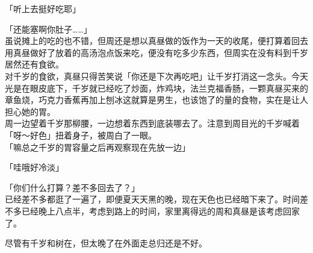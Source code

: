 「听上去挺好吃耶」

「还能塞啊你肚子……」\\

虽说摊上的吃的也不错，但周还是想以真昼做的饭作为一天的收尾，便打算着回去用真昼做好了放着的高汤泡点饭来吃，便没有吃多少东西，但周实在没有料到千岁居然还有食欲。\\

对千岁的食欲，真昼只得苦笑说「你还是下次再吃吧」让千岁打消这一念头。今天光是在眼皮底下，千岁就已经吃了炒面，炸鸡块，法兰克福香肠，一颗真昼买来的章鱼烧，巧克力香蕉再加上刨冰这就算是男生，也该饱了的量的食物，实在是让人担心她的胃。\\

周一边望着千岁那柳腰，一边想着东西到底装哪去了。注意到周目光的千岁喊着「呀～好色」扭着身子，被周白了一眼。\\

「嘛总之千岁的胃容量之后再观察现在先放一边」

「哇哦好冷淡」

「你们什么打算？差不多回去了？」\\

已经差不多都逛了一遍了，即便夏天天黑的晚，现在天色也已经暗下来了。时间差不多已经晚上八点半，考虑到路上的时间，家里离得远的周和真昼是该考虑回家了。

尽管有千岁和树在，但太晚了在外面走总归还是不好。\\

